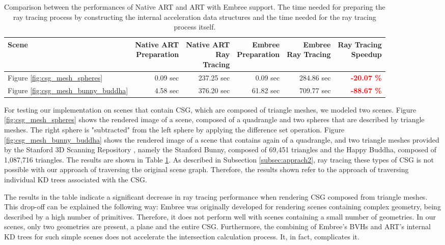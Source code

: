 \begin{table}[h]
	\centering
	{\footnotesize\sf
		\begin{tabular}{lrrrrr}
			\toprule
			Scene  & \thead{Native ART \\ Preparation} & \thead{Native ART \\ Ray \\ Tracing} & \thead{Embree \\ Preparation} & \thead{Embree \\ Ray Tracing} & \thead{Ray Tracing \\ Speedup} \\ 
			\midrule
			Figure \ref{fig:csg_mesh_spheres} & 0.09 sec & 237.25 sec & 0.09 sec & 284.86 sec & \textbf{\textcolor{red}{-20.07 \%}} \\
			Figure \ref{fig:csg_mesh_bunny_buddha} & 4.58 sec & 376.20 sec & 61.82 sec & 709.77 sec  & \textbf{\textcolor{red}{-88.67 \%}} \\
			\bottomrule
	\end{tabular}}
	\caption{Comparison between the performances of Native ART and ART with Embree support. The time needed for preparing the ray tracing process by constructing the internal acceleration data structures and the time needed for the ray tracing process itself.}
	\label{tab:csg_mesh}
\end{table}

For testing our implementation on scenes that contain CSG, which are composed of triangle meshes, we modeled two scenes. Figure \ref{fig:csg_mesh_spheres} shows the rendered image of a scene, composed of a quadrangle and two spheres that are described by triangle meshes. The right sphere is "subtracted" from the left sphere by applying the difference set operation. Figure \ref{fig:csg_mesh_bunny_buddha} shows the rendered image of a scene that contains again of a quadrangle, and two triangle meshes provided by the Stanford 3D Scanning Repository \cite{plyRepo}, namely the Stanford Bunny, composed of 69,451 triangles and the Happy Buddha, composed of 1,087,716 triangles. The results are shown in Table \ref{tab:csg_mesh}.
As described in Subsection \ref{subsec:apprach2}, ray tracing these types of CSG is not possible with our approach of traversing the original scene graph. Therefore, the results shown refer to the approach of traversing individual KD trees associated with the CSG.

The results in the table indicate a significant decrease in ray tracing performance when rendering CSG composed from triangle meshes. This drop-off can be explained the following way: Embree was originally developed for rendering scenes containing complex geometry, being described by a high number of primitives. Therefore, it does not perform well with scenes containing a small number of geometries. In our scenes, only two geometries are present, a plane and the entire CSG. Furthermore, the combining of Embree's BVHs and ART's internal KD trees for such simple scenes does not accelerate the intersection calculation process. It, in fact, complicates it.


